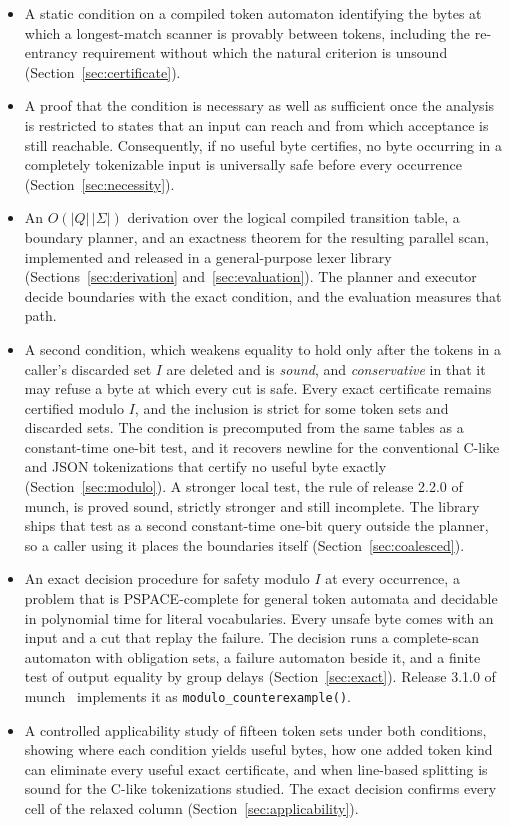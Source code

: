 \documentclass[11pt,a4paper]{article}
\theoremstyle{definition}
\theoremstyle{plain}
\newcommand{\code}[1]{\texttt{#1}}
\begin{document}
\begin{itemize}
\item A static condition on a compiled token automaton identifying the bytes at which a longest-match scanner is
provably between tokens, including the re-entrancy requirement without which the natural criterion is unsound
(Section~\ref{sec:certificate}).
\item A proof that the condition is necessary as well as sufficient once the analysis is restricted to states that an
input can reach and from which acceptance is still reachable. Consequently, if no useful byte certifies, no byte
occurring in a completely tokenizable input is universally safe before every occurrence (Section~\ref{sec:necessity}).
\item An $O(|Q|\,|\Sigma|)$ derivation over the logical compiled transition table, a boundary planner, and an exactness
theorem for the resulting parallel scan, implemented and released in a general-purpose lexer library
(Sections~\ref{sec:derivation} and~\ref{sec:evaluation}). The planner and executor decide boundaries with the exact
condition, and the evaluation measures that path.
\item A second condition, which weakens equality to hold only after the tokens in a caller's discarded set $I$ are
deleted and is \emph{sound}, and \emph{conservative} in that it may refuse a byte at which every cut is safe. Every
exact certificate remains certified modulo $I$, and the inclusion is strict for some token sets and discarded sets. The
condition is precomputed from the same tables as a constant-time one-bit test, and it recovers newline for the
conventional C-like and JSON tokenizations that certify no useful byte exactly (Section~\ref{sec:modulo}). A stronger
local test, the rule of release 2.2.0 of munch, is proved sound, strictly stronger and still incomplete. The library
ships that test as a second constant-time one-bit query outside the planner, so a caller using it places the boundaries
itself (Section~\ref{sec:coalesced}). \item An exact decision procedure for safety modulo $I$ at every occurrence, a
problem that is PSPACE-complete for general token automata and decidable in polynomial time for literal vocabularies.
Every unsafe byte comes with an input and a cut that replay the failure. The decision runs a complete-scan automaton
with obligation sets, a failure automaton beside it, and a finite test of output equality by group delays
(Section~\ref{sec:exact}). Release 3.1.0 of munch~\cite{munch310} implements it as \code{modulo\_counterexample()}.
\item A controlled applicability study of fifteen token sets under both conditions, showing where each condition yields
useful bytes, how one added token kind can eliminate every useful exact certificate, and when line-based splitting is
sound for the C-like tokenizations studied. The exact decision confirms every cell of the relaxed column
(Section~\ref{sec:applicability}).
\end{itemize}
\end{document}
